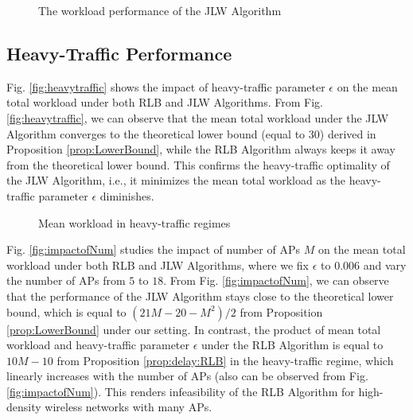 \documentclass[10pt, conference, letterpaper]{IEEEtran} %
\begin{document}
\begin{figure}[!hbt]
\vspace{-0.2in}
\centerline{ 
\hspace{-0.2in}
 }\caption{The workload performance of the JLW Algorithm}
 \vspace{-0.2in}
\end{figure}



\subsection{Heavy-Traffic Performance}

Fig. \ref{fig:heavytraffic} shows the impact of heavy-traffic parameter $\epsilon$ on the mean total workload under both RLB and JLW Algorithms. From Fig. \ref{fig:heavytraffic}, we can observe that the mean total workload under the JLW Algorithm converges to the theoretical lower bound (equal to $30$) derived in Proposition \ref{prop:LowerBound}, while the RLB Algorithm always keeps it away from the theoretical lower bound. This confirms the heavy-traffic optimality of the JLW Algorithm, i.e., it minimizes the mean total workload as the heavy-traffic parameter $\epsilon$ diminishes. 


\begin{figure}[!hbt]
\vspace{-0.2in}
\centerline{ 
\hspace{-0.1in}
 }\caption{Mean workload in heavy-traffic regimes}
\vspace{-0.15in}
\end{figure}

Fig. \ref{fig:impactofNum} studies the impact of number of APs $M$ on the mean total workload under both RLB and JLW Algorithms, where we fix $\epsilon$ to $0.006$ and vary the number of APs from $5$ to $18$. From Fig. \ref{fig:impactofNum}, we can observe that the performance of the JLW Algorithm stays close to the theoretical lower bound, which is equal to $(21M-20-M^2)/2$ from Proposition \ref{prop:LowerBound} under our setting. In contrast, the product of mean total workload and heavy-traffic parameter $\epsilon$ under the RLB Algorithm is equal to $10M-10$ from Proposition \ref{prop:delay:RLB} in the heavy-traffic regime, which  linearly increases with the number of APs (also can be observed from Fig. \ref{fig:impactofNum}). This renders infeasibility of the RLB Algorithm for high-density wireless networks with many APs. 
\end{document}
